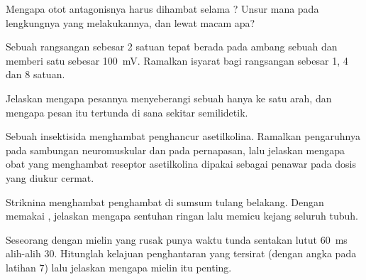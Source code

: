 \begin{exercise}[$\star\star$]\label{exo:g12:stretch-reflex:9}
Mengapa otot antagonisnya harus dihambat selama ? Unsur mana
pada lengkungnya yang melakukannya, dan lewat  macam apa?
\end{exercise}

\begin{exercise}[$\star\star$]\label{exo:g12:stretch-reflex:10}
Sebuah rangsangan sebesar 2 satuan tepat berada pada ambang sebuah
 dan memberi satu  sebesar \qty{100}{mV}. Ramalkan
isyarat bagi rangsangan sebesar 1, 4 dan 8 satuan.
\end{exercise}

\begin{exercise}[$\star\star$]\label{exo:g12:stretch-reflex:11}
Jelaskan mengapa pesannya menyeberangi sebuah  hanya ke satu
arah, dan mengapa pesan itu tertunda di sana sekitar semilidetik.
\end{exercise}

\begin{exercise}[$\star\star\star$]\label{exo:g12:stretch-reflex:12}
Sebuah insektisida menghambat  penghancur asetilkolina. Ramalkan
pengaruhnya pada sambungan neuromuskular dan pada pernapasan, lalu
jelaskan mengapa obat yang menghambat reseptor asetilkolina dipakai
sebagai penawar pada dosis yang diukur cermat.
\end{exercise}

\begin{exercise}[$\star\star\star$]\label{exo:g12:stretch-reflex:13}
Striknina menghambat  penghambat di sumsum tulang belakang.
Dengan memakai , jelaskan mengapa sentuhan ringan
lalu memicu kejang seluruh tubuh.
\end{exercise}

\begin{exercise}[$\star\star\star$]\label{exo:g12:stretch-reflex:14}
Seseorang dengan mielin yang rusak punya waktu tunda sentakan lutut
\qty{60}{ms} alih-alih 30. Hitunglah kelajuan penghantaran yang
tersirat (dengan angka pada latihan 7) lalu jelaskan mengapa mielin itu
penting.
\end{exercise}

